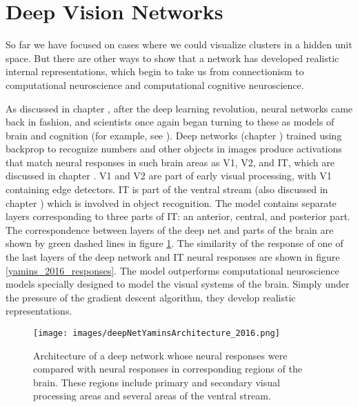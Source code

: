 \section{Deep Vision Networks}\label{deepVisionNets}

So far we have focused on cases where we could visualize clusters in a hidden unit space. But there are other ways to show that a network has developed realistic internal representations, which begin to take us from connectionism to computational neuroscience and computational cognitive neuroscience.

As discussed in chapter , after the deep learning revolution, neural networks came back in fashion, and scientists once again began turning to these as models of brain and cognition (for example, see  \cite{yamins2014performance, yamins2016using}). Deep networks (chapter ) trained using backprop to recognize numbers and other objects in images produce activations that match neural responses in such brain areas as V1, V2, and IT, which are discussed in chapter .  V1 and V2 are part of early visual processing, with V1 containing edge detectors. IT is part of the ventral stream (also discussed in chapter ) which is involved in object recognition. The model contains separate layers corresponding to three parts of IT: an anterior, central, and posterior part. The correspondence between layers of the deep net and parts of the brain are shown by green dashed lines in figure \ref{yamins_2016_architecture}.  The similarity of the response of one of the last layers of the deep network and IT neural responses are shown in figure \ref{yamins_2016_responses}.  The model outperforms computational neuroscience models specially designed to model the visual systems of the brain. Simply under the pressure of the gradient descent algorithm, they develop realistic representations.

\begin{figure}[h]
\centering
\texttt{[image: images/deepNetYaminsArchitecture\_2016.png]}
\caption[Yamins.]{Architecture of a deep network whose neural responses were compared with neural responses in corresponding regions of the brain. These regions include primary and secondary visual processing areas and several areas of the ventral stream.}
\label{yamins_2016_architecture}
\end{figure}

